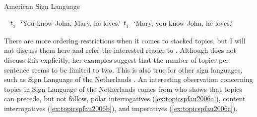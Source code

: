 \begin{exe}
\ex American Sign Language \label{topicstacingasltwo}\begin{xlist} 
\ex \textcolor{white}{*}   $\textrm{\textit{t}}$\textsubscript{i}
\glt \textcolor{white}{*}`You know John, Mary, he loves.' \label{ex:topicstacingasltwoa}
\ex *   {$\textrm{\textit{t}}$\textsubscript{i}}
\glt \textcolor{white}{*}`Mary, you know John, he loves.' \label{ex:topicstacingasltwob}
\end{xlist}
\end{exe} 

\noindent There are more ordering restrictions when it comes to stacked topics, but I will not discuss them here and refer the interested reader to \citet{aarons1996topics}. Although \citet{aarons1996topics} does not discuss this explicitly, her examples suggest that the number of topics per sentence seems to be limited to two. This is also true for other sign languages, such as Sign Language of the Netherlands \citep{pfau2008topics}. An interesting observation concerning topics in Sign Language of the Netherlands comes from \citet{pfau2008topics} who shows that topics can precede, but not follow, polar interrogatives (\ref{ex:topicspfau2006a}), content interrogatives (\ref{ex:topicspfau2006b}), and imperatives (\ref{ex:topicspfau2006c}).

